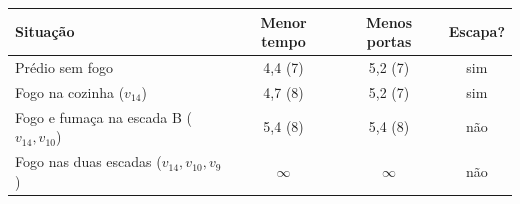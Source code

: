 \begin{tabular}{lccc}
\toprule
Situação & Menor tempo & Menos portas & Escapa? \\
\midrule
Prédio sem fogo & 4{,}4 (7) & 5{,}2 (7) & sim \\
Fogo na cozinha ($v_{14}$) & 4{,}7 (8) & 5{,}2 (7) & sim \\
Fogo e fumaça na escada B ($v_{14}, v_{10}$) & 5{,}4 (8) & 5{,}4 (8) & não \\
Fogo nas duas escadas ($v_{14}, v_{10}, v_9$) & $\infty$ & $\infty$ & não \\
\bottomrule
\end{tabular}

